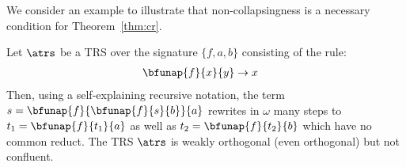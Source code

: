 We consider an example to illustrate that non-collapsingness is a necessary condition for Theorem~\ref{thm:cr}.
\begin{example}\label{ex:collapse}
  Let $\atrs$ be a TRS over the signature $\{f,a,b\}$ consisting of the rule:
  \begin{align*}
    \bfunap{f}{x}{y} &\to x
  \end{align*}
  Then, using a self-explaining recursive notation, 
  the term $s = \bfunap{f}{\bfunap{f}{s}{b}}{a}$ rewrites in $\omega$ many steps to 
  $t_1 = \bfunap{f}{t_1}{a}$ as well as $t_2 = \bfunap{f}{t_2}{b}$ which have no common reduct.
  The TRS $\atrs$ is weakly orthogonal (even orthogonal) but not confluent.
\end{example}
